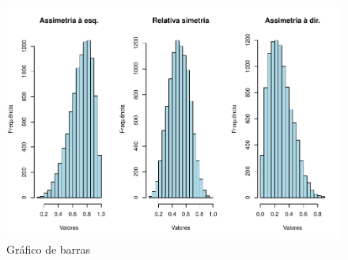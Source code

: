 \documentclass[
]{book}
\begin{document}
\begin{figure}
\centering
\includegraphics{apostila_files/figure-latex/unnamed-chunk-41-1.pdf}
\caption{\label{fig:unnamed-chunk-41}Gráfico de barras}
\end{figure}

\hfill\break
\end{document}
